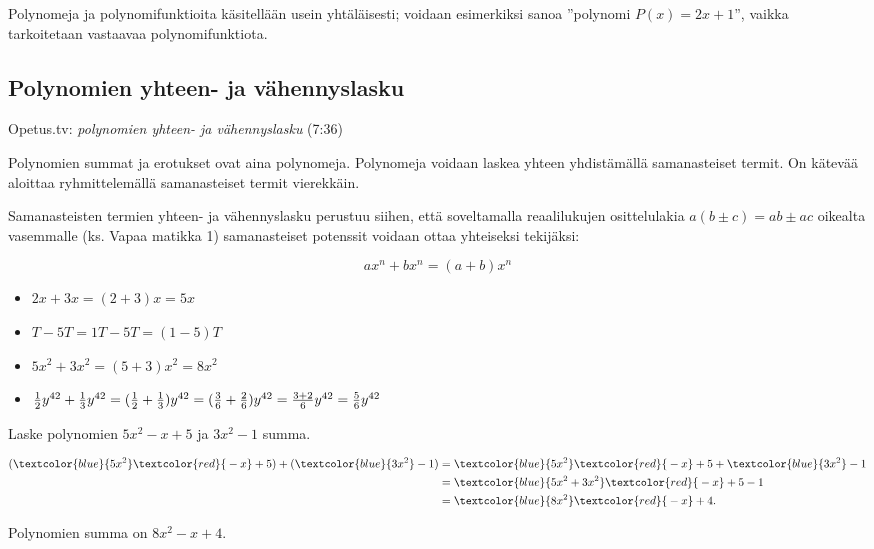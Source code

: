 Polynomeja ja polynomifunktioita käsitellään usein yhtäläisesti; voidaan esimerkiksi sanoa ''polynomi $P(x)=2x+1$'', vaikka tarkoitetaan vastaavaa polynomifunktiota.


\subsection*{Polynomien yhteen- ja vähennyslasku}

{Opetus.tv: \emph{polynomien yhteen- ja vähennyslasku} (7:36)}

Polynomien summat ja erotukset ovat aina polynomeja. Polynomeja voidaan laskea yhteen yhdistämällä samanasteiset termit. On kätevää aloittaa ryhmittelemällä samanasteiset termit vierekkäin. 

Samanasteisten termien yhteen- ja vähennyslasku perustuu siihen, että soveltamalla reaalilukujen osittelulakia $a(b\pm c)=ab\pm ac$ oikealta vasemmalle (ks. Vapaa matikka 1) samanasteiset potenssit voidaan ottaa yhteiseksi tekijäksi:

\[ ax^n+bx^n = (a+b)x^n \]

\begin{esimerkki}

	\begin{itemize}
	\item $2x+3x=(2+3)x=5x$
	\item $T-5T=1T-5T=(1-5)T$
	\item $5x^2+3x^2 = (5+3)x^2 = 8x^2$
	\item $\frac{1}{2}y^{42}+\frac{1}{3}y^{42}=(\frac{1}{2}+\frac{1}{3})y^{42}= \\
	(\frac{3}{6}+\frac{2}{6})y^{42}=\frac{3+2}{6}y^{42}=\frac{5}{6}y^{42}$
	\end{itemize}
\end{esimerkki}

\begin{esimerkki}
Laske polynomien $5x^2-x+5$ ja $3x^2-1$ summa.
    \begin{esimratk}
        \begin{align*}
            (\textcolor{blue}{5x^2} \textcolor{red}{{}-x} + 5) + (\textcolor{blue}{3x^2} -1) 
            &=\textcolor{blue}{5x^2} \textcolor{red}{{}-x} + 5 + \textcolor{blue}{3x^2} -1 \\
            &=\textcolor{blue}{5x^2+3x^2} \textcolor{red}{{}-x} +5-1\\
            &=\textcolor{blue}{8x^2} \textcolor{red}{{}-x}+4.
        \end{align*}
    \end{esimratk}
    \begin{esimvast}
        Polynomien summa on $8x^2-x+4$.
    \end{esimvast}
\end{esimerkki}

